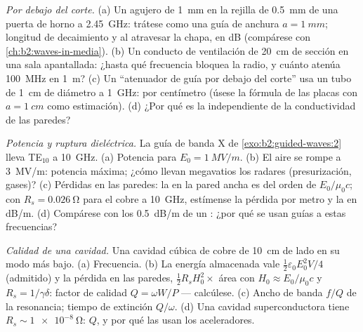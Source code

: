 \begin{exercise}[$\star\star$]\label{exo:b2:guided-waves:6}
\emph{Por debajo del corte.} (a) Un agujero de \qty{1}{mm} en la rejilla de \qty{0.5}{mm} de una
puerta de horno a \qty{2.45}{GHz}: trátese como una guía de anchura $a = \qty{1}{mm}$;
longitud de decaimiento y  al atravesar la chapa, en dB (compárese con
\cref{ch:b2:waves-in-media}). (b) Un conducto de ventilación de \qty{20}{cm}
de sección en una sala apantallada: ¿hasta qué frecuencia bloquea la radio,
y cuánto atenúa \qty{100}{MHz} en \qty{1}{m}? (c) Un
``atenuador de guía por debajo del corte'' usa un tubo de \qty{1}{cm} de diámetro a
\qty{1}{GHz}:  por centímetro (úsese la fórmula de las placas con $a =
\qty{1}{cm}$ como estimación). (d) ¿Por qué es la  independiente de
la conductividad de las paredes?
\end{exercise}

\begin{exercise}[$\star\star$]\label{exo:b2:guided-waves:7}
\emph{Potencia y ruptura dieléctrica.} La guía de banda X de \cref{exo:b2:guided-waves:2}
lleva TE$_{10}$ a \qty{10}{GHz}. (a) Potencia para $E_0 = \qty{1}{MV/m}$. (b) El aire
se rompe a \qty{3}{MV/m}: potencia máxima; ¿cómo llevan megavatios los radares
(presurización, gases)? (c) Pérdidas en las paredes: la 
en la pared ancha es del orden de $E_0/\mu_0c$; con $R_s = \qty{0.026}{\ohm}$ para
el cobre a \qty{10}{GHz}, estímense la pérdida por metro y la 
en dB/m. (d) Compárese con los \qty{0.5}{dB/m} de un : ¿por qué se usan
guías a estas frecuencias?
\end{exercise}

\begin{exercise}[$\star\star$]\label{exo:b2:guided-waves:8}
\emph{Calidad de una cavidad.} Una cavidad cúbica de cobre de \qty{10}{cm} de lado en su
modo más bajo. (a) Frecuencia. (b) La energía almacenada vale $\tfrac12\varepsilon_0E_0^2V/4$
(admitido) y la pérdida en las paredes, $\tfrac12R_sH_0^2\times$ área con $H_0 \approx E_0/
\mu_0c$ y $R_s = 1/\gamma\delta$: factor de calidad $Q = \omega W/P$ --- calcúlese.
(c) Ancho de banda $f/Q$ de la resonancia; tiempo de extinción $Q/\omega$. (d) Una
cavidad superconductora tiene $R_s \sim \qty{1e-8}{\ohm}$: $Q$, y por qué las
usan los aceleradores.
\end{exercise}

